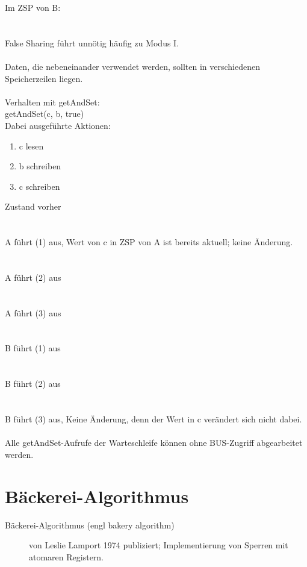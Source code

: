 Im ZSP von B:\\ %
\\ %
\\
False Sharing führt unnötig häufig zu Modus I.\\
\\
Daten, die nebeneinander verwendet werden, sollten in verschiedenen Speicherzeilen liegen.\\
\\
Verhalten mit getAndSet:\\
getAndSet(c, b, true)\\
Dabei ausgeführte Aktionen:
\begin{enumerate}
	\item c lesen
	\item b schreiben
	\item c schreiben
\end{enumerate}
Zustand vorher\\
\\ %
\\
A führt (1) aus, Wert von c in ZSP von A ist bereits aktuell; keine Änderung.\\
\\ %
\\
A führt (2) aus\\
\\ %
\\ 
A führt (3) aus\\
\\ %
\\
B führt (1) aus\\
\\ %
\\
B führt (2) aus\\
\\ %
\\
B führt (3) aus, Keine Änderung, denn der Wert in c verändert sich nicht dabei.\\
\\
Alle getAndSet-Aufrufe der Warteschleife können ohne BUS-Zugriff abgearbeitet werden.

\section{Bäckerei-Algorithmus}
\begin{description}
	\item[Bäckerei-Algorithmus (engl bakery algorithm)] von Leslie Lamport 1974 publiziert; Implementierung von Sperren mit atomaren Registern.
\end{description}

